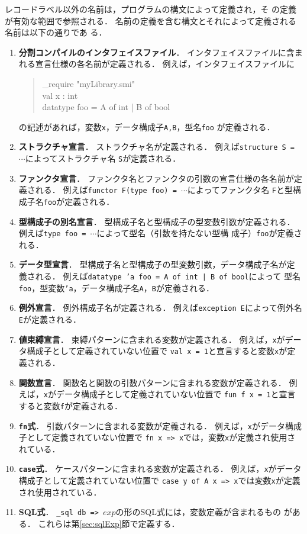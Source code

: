 \documentclass{jbook}
\newcommand{\code}[1]{\mbox{\large\tt #1}}
\newenvironment{program}{\begin{quote}\begin{tt}}%
                        {\end{tt}\end{quote}}
\begin{document}
	レコードラベル以外の名前は，プログラムの構文によって定義され，そ
の定義が有効な範囲で参照される．
	名前の定義を含む構文とそれによって定義される名前は以下の通りであ
る．
\begin{enumerate}
\item {\bf 分割コンパイルのインタフェイスファイル}．
	インタフェイスファイルに含まれる宣言仕様の各名前が定義される．
	例えば，インタフェイスファイルに
\begin{program}
\_require "myLibrary.smi"\\
val x : int\\
datatype foo = A of int | B of bool
\end{program}
の記述があれば，変数\code{x}，データ構成子\code{A,B}，型名\code{foo}
が定義される．
\item {\bf ストラクチャ宣言}．
	ストラクチャ名が定義される．
	例えば\code{structure S = $\cdots$}によってストラクチャ名
\code{S}が定義される．
\item {\bf ファンクタ宣言}．
	ファンクタ名とファンクタの引数の宣言仕様の各名前が定義される．
	例えば\code{functor F(type foo) = $\cdots$}によってファンクタ名
\code{F}と型構成子名\code{foo}が定義される．
\item {\bf 型構成子の別名宣言}．
	型構成子名と型構成子の型変数引数が定義される．
	例えば\code{type foo = $\cdots$}によって型名（引数を持たない型構
成子）\code{foo}が定義される．
\item {\bf データ型宣言}．
	型構成子名と型構成子の型変数引数，データ構成子名が定義される．
	例えば\code{datatype 'a foo = A of int | B of bool}によって
型名\code{foo}，型変数\code{'a}，データ構成子名\code{A}，\code{B}が定義される．
\item {\bf 例外宣言}．
	例外構成子名が定義される．
	例えば\code{exception E}によって例外名\code{E}が定義される．
\item {\bf 値束縛宣言}．
	束縛パターンに含まれる変数が定義される．
	例えば，\code{x}がデータ構成子として定義されていない位置で
\code{val x = 1}と宣言すると変数\code{x}が定義される．
\item {\bf 関数宣言}．
	関数名と関数の引数パターンに含まれる変数が定義される．
	例えば，\code{x}がデータ構成子として定義されていない位置で
\code{fun f x = 1}と宣言すると変数\code{f}が定義される．
\item {\bf \code{fn}式}．
	引数パターンに含まれる変数が定義される．
	例えば，\code{x}がデータ構成子として定義されていない位置で
\code{fn x => x}では，変数\code{x}が定義され使用されている．
\item {\bf \code{case}式}．
	ケースパターンに含まれる変数が定義される．
	例えば，\code{x}がデータ構成子として定義されていない位置で
\code{case y of A x => x}では変数\code{x}が定義され使用されている．
\item {\bf SQL式}．
	\code{\_sql db => $exp$}の形のSQL式には，変数定義が含まれるもの
がある．
	これらは第\ref{sec:sqlExp}節で定義する．
\end{enumerate}
\end{document}
